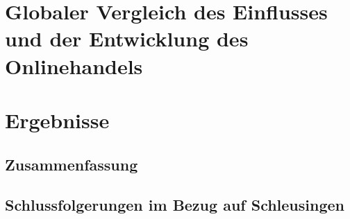 \documentclass[a4paper, 12pt]{scrartcl}
\begin{document}
            
        
    \section{Globaler Vergleich des Einflusses und der Entwicklung des Onlinehandels}
            
        \newpage
        
        
        
    \section{Ergebnisse}
        \subsection{Zusammenfassung}
            
            
            
        \subsection{Schlussfolgerungen im Bezug auf Schleusingen}
            
        \newpage
        
        
        
    
        \newpage
        
    \listoffigures
        \newpage
        
    
    
        \newpage
    
    
    
        \newpage
    
        
        
\end{document}
